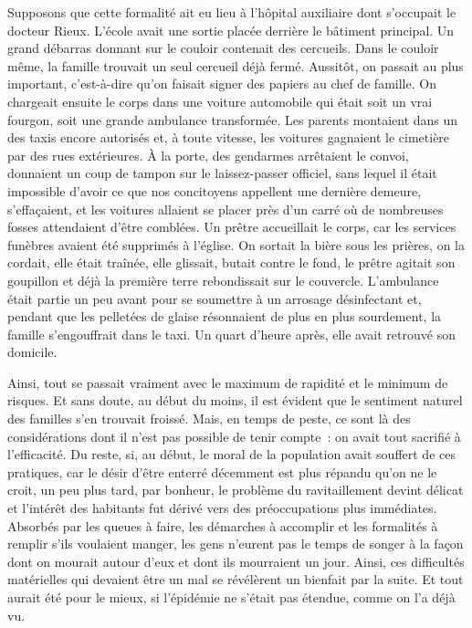 \documentclass[french,twoside]{book} %
\begin{document}
Supposons que cette formalité ait eu lieu à l’hôpital auxiliaire dont s’occupait le docteur Rieux. L’école avait une sortie placée derrière le bâtiment principal. Un grand débarras donnant sur le couloir contenait des cercueils. Dans le couloir même, la famille trouvait un seul cercueil déjà fermé. Aussitôt, on passait au plus important, c’est-à-dire qu’on faisait signer des papiers au chef de famille. On chargeait ensuite le corps dans une voiture automobile qui était soit un vrai fourgon, soit une grande ambulance transformée. Les parents montaient dans un des taxis encore autorisés et, à toute vitesse, les voitures gagnaient le cimetière par des rues extérieures. À la porte, des gendarmes arrêtaient le convoi, donnaient un coup de tampon sur le laissez-passer officiel, sans lequel il était impossible d’avoir ce que nos concitoyens appellent une dernière demeure, s’effaçaient, et les voitures allaient se placer près d’un carré où de nombreuses fosses attendaient d’être comblées. Un prêtre accueillait le corps, car les services funèbres avaient été supprimés à l’église. On sortait la bière sous les prières, on la cordait, elle était traînée, elle glissait, butait contre le fond, le prêtre agitait son goupillon et déjà la première terre rebondissait sur le couvercle. L’ambulance était partie un peu avant pour se soumettre à un arrosage désinfectant et, pendant que les pelletées de glaise résonnaient de plus en plus sourdement, la famille s’engouffrait dans le taxi. Un quart d’heure après, elle avait retrouvé son domicile.\par
Ainsi, tout se passait vraiment avec le maximum de rapidité et le minimum de risques. Et sans doute, au début du moins, il est évident que le sentiment naturel des familles s’en trouvait froissé. Mais, en temps de peste, ce sont là des considérations dont il n’est pas possible de tenir compte : on avait tout sacrifié à l’efficacité. Du reste, si, au début, le moral de la population avait souffert de ces pratiques, car le désir d’être enterré décemment est plus répandu qu’on ne le croit, un peu plus tard, par bonheur, le problème du ravitaillement devint délicat et l’intérêt des habitants fut dérivé vers des préoccupations plus immédiates. Absorbés par les queues à faire, les démarches à accomplir et les formalités à remplir s’ils voulaient manger, les gens n’eurent pas le temps de songer à la façon dont on mourait autour d’eux et dont ils mourraient un jour. Ainsi, ces difficultés matérielles qui devaient être un mal se révélèrent un bienfait par la suite. Et tout aurait été pour le mieux, si l’épidémie ne s’était pas étendue, comme on l’a déjà vu.\par
\end{document}
